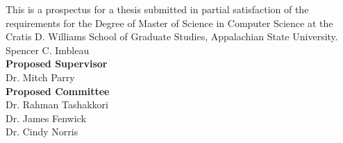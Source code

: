 \vspace*{\fill}
\begin{center}
\title{\Large\thesistitle}
\vfill
This is a prospectus for a thesis submitted in partial satisfaction of the requirements for the Degree of Master of Science in Computer Science at the Cratis D. Williams School of Graduate Studies, Appalachian State University.
\vfill
Spencer C. Imbleau\\
\medskip
\textbf{Proposed Supervisor}\\
Dr. Mitch Parry\\
\medskip
\textbf{Proposed Committee}\\
Dr. Rahman Tashakkori\\
Dr. James Fenwick\\
Dr. Cindy Norris
\end{center}
\vfill %